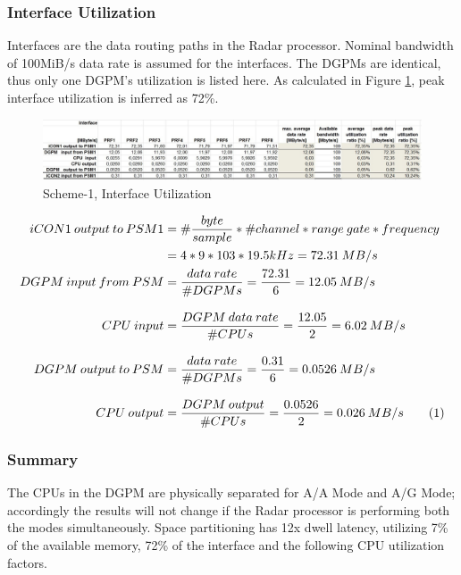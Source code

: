 \subsubsection{Interface Utilization}
\label{sec:scheme1:aa_interface_util}
Interfaces are the data routing paths in the Radar processor. Nominal bandwidth of 100MiB/s data rate is assumed for the interfaces. The DGPMs are identical, thus only one DGPM's utilization is listed here. As calculated in Figure \ref{fig:existing_analysis:aa_scheme1_interface_util}, peak interface utilization is inferred as 72\%.
\begin{figure}[h!]
	\centering
	\includegraphics[width=160mm]{figures/aa_scheme1_interface_util}
	\caption{Scheme-1, Interface Utilization}
	\label{fig:existing_analysis:aa_scheme1_interface_util}
\end{figure}

\begin{align*}
	\label{equ:aa:scheme1:interface_util}
	iCON1 \: output \: to \: PSM1 &= \#\frac{byte}{sample} * \#channel * range \: gate * frequency \\
	&= 4 * 9 * 103 * 19.5kHz = 72.31 \: MB/s \\
	DGPM \: input \: from \: PSM &= \frac{data \: rate}{\#DGPMs} = \frac{72.31}{6} = 12.05 \: MB/s \\[0.3cm]
	CPU \: input &= \frac{DGPM \: data \: rate}{\#CPUs} = \frac{12.05}{2} = 6.02 \: MB/s \\[0.3cm]
	DGPM \: output \: to \: PSM &= \frac{data \: rate}{\#DGPMs} = \frac{0.31}{6} = 0.0526 \: MB/s \\[0.3cm]
	CPU \: output &= \frac{DGPM \: output}{\#CPUs} = \frac{0.0526}{2} = 0.026 \: MB/s \stepcounter{equation}\tag{\theequation}
\end{align*}
\FloatBarrier

\subsubsection{Summary}
The CPUs in the DGPM are physically separated for A/A Mode and A/G Mode; accordingly the results will not change if the Radar processor is performing both the modes simultaneously. Space partitioning has 12x dwell latency, utilizing 7\% of the available memory, 72\% of the interface and the following CPU utilization factors.

